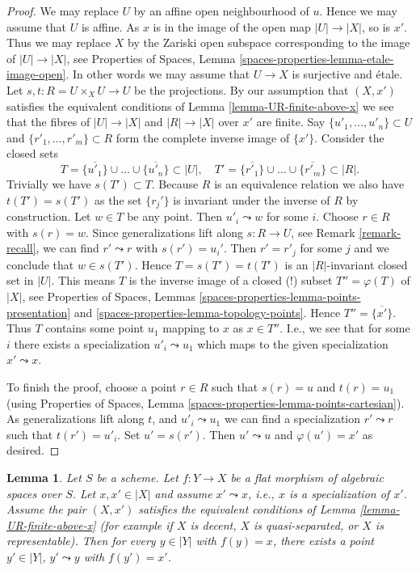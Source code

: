 \documentclass{stacks-project}
\theoremstyle{plain}
\newtheorem{lemma}[subsection]{Lemma}
\theoremstyle{definition}
\theoremstyle{remark}
\numberwithin{equation}{subsection}
\begin{document}
\begin{proof}
We may replace $U$ by an affine open neighbourhood of $u$.
Hence we may assume that $U$ is affine. As $x$ is in the
image of the open map $|U| \to |X|$, so is $x'$. Thus we may
replace $X$ by the Zariski open subspace corresponding to
the image of $|U| \to |X|$, see
Properties of Spaces,
Lemma \ref{spaces-properties-lemma-etale-image-open}.
In other words we may assume that
$U \to X$ is surjective and \'etale.
Let $s, t : R = U \times_X U \to U$ be the projections.
By our assumption that $(X, x')$ satisfies the equivalent conditions of
Lemma \ref{lemma-UR-finite-above-x}
we see that the fibres of $|U| \to |X|$ and $|R| \to |X|$
over $x'$ are finite. Say $\{u'_1, \ldots, u'_n\} \subset U$ and
$\{r'_1, \ldots, r'_m\} \subset R$ form the complete inverse image
of $\{x'\}$.
Consider the closed sets
$$
T = \overline{\{u'_1\}} \cup \ldots \cup \overline{\{u'_n\}} \subset |U|,
\quad
T' = \overline{\{r'_1\}} \cup \ldots \cup \overline{\{r'_m\}} \subset |R|.
$$
Trivially we have $s(T') \subset T$. Because $R$ is an equivalence
relation we also have $t(T') = s(T')$ as the set $\{r_j'\}$
is invariant under the inverse of $R$ by construction. Let $w \in T$
be any point. Then $u'_i \leadsto w$ for some $i$. Choose $r \in R$
with $s(r) = w$. Since generalizations lift along $s : R \to U$, see
Remark \ref{remark-recall}, we can find $r' \leadsto r$ with
$s(r') = u_i'$. Then $r' = r'_j$ for some $j$ and we conclude that
$w \in s(T')$. Hence $T = s(T') = t(T')$ is an $|R|$-invariant closed
set in $|U|$. This means $T$ is the inverse image of a closed (!)
subset $T'' = \varphi(T)$ of $|X|$, see
Properties of Spaces,
Lemmas \ref{spaces-properties-lemma-points-presentation} and
\ref{spaces-properties-lemma-topology-points}.
Hence $T'' = \overline{\{x'\}}$.
Thus $T$ contains some point $u_1$ mapping to $x$ as $x \in T''$.
I.e., we see that for some $i$ there exists a specialization
$u'_i \leadsto u_1$ which maps to the given specialization
$x' \leadsto x$.

\medskip\noindent
To finish the proof, choose a point $r \in R$ such that
$s(r) = u$ and $t(r) = u_1$ (using
Properties of Spaces,
Lemma \ref{spaces-properties-lemma-points-cartesian}).
As generalizations lift along $t$, and $u'_i \leadsto u_1$
we can find a specialization $r' \leadsto r$ such that $t(r') = u'_i$.
Set $u' = s(r')$. Then $u' \leadsto u$ and $\varphi(u') = x'$ as
desired.
\end{proof}

\begin{lemma}
\label{lemma-generalizations-lift-flat}
Let $S$ be a scheme. Let $f : Y \to X$ be a  flat morphism of algebraic spaces
over $S$. Let $x, x' \in |X|$ and assume $x' \leadsto x$, i.e., $x$ is a
specialization of $x'$. Assume the pair $(X, x')$ satisfies the equivalent
conditions of Lemma \ref{lemma-UR-finite-above-x} (for example if
$X$ is decent, $X$ is quasi-separated, or $X$ is representable).
Then for every $y \in |Y|$ with $f(y) = x$, there exists a point $y' \in |Y|$,
$y' \leadsto y$ with $f(y') = x'$.
\end{lemma}
\end{document}
